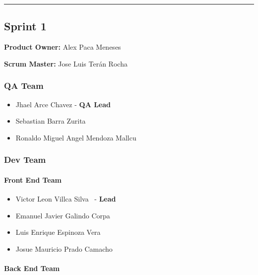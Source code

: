 \documentclass{article}
\providecommand{\tightlist}{
  \setlength{\itemsep}{0pt}\setlength{\parskip}{0pt}}
\begin{document}
\begin{center}\rule{0.5\linewidth}{0.5pt}\end{center}

\hypertarget{sprint1}{
\subsection{\texorpdfstring{\textbf{Sprint
1}}{Sprint 1}}\label{sprint1}}

\textbf{Product Owner: }
Alex Paca Meneses

\textbf{Scrum Master: }
Jose Luis Terán Rocha

\hypertarget{qateam-1}{
\subsubsection{\texorpdfstring{\textbf{QA Team}}{QA Team}}\label{qateam-1}}

\begin{itemize}
\tightlist
\item
  Jhael Arce Chavez - \textbf{QA Lead}
\item
  Sebastian Barra Zurita
\item
  Ronaldo Miguel Angel Mendoza Mallcu
\end{itemize}

\hypertarget{devteam-1}{
\subsubsection{\texorpdfstring{\textbf{Dev
Team}}{Dev Team}}\label{devteam-1}}

\paragraph{Front End Team}\label{front-end-team-1}

\begin{itemize}
\tightlist
\item
  Victor Leon Villca Silva ~- \textbf{Lead}
\item
  Emanuel Javier Galindo Corpa
\item
  Luis Enrique Espinoza Vera
\item
  Josue Mauricio Prado Camacho
\end{itemize}

\paragraph{Back End Team}\label{back-end-team-1}
\end{document}
